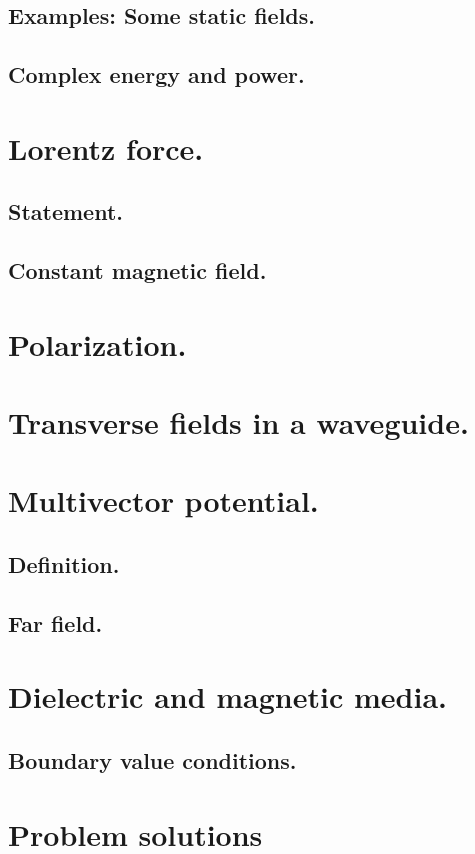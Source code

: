          \subsection{Examples: Some static fields.}
            
         \subsection{Complex energy and power.}
            
      \section{Lorentz force.}
         \subsection{Statement.}
            
         \subsection{Constant magnetic field.}
            
      \section{Polarization.}
         
      \section{Transverse fields in a waveguide.}
         
      \section{Multivector potential.}
         \subsection{Definition.}
         
         \subsection{Far field.}
            
      \section{Dielectric and magnetic media.}
         
         \subsection{Boundary value conditions.}
            
      \section{Problem solutions}
         \shipoutAnswer

